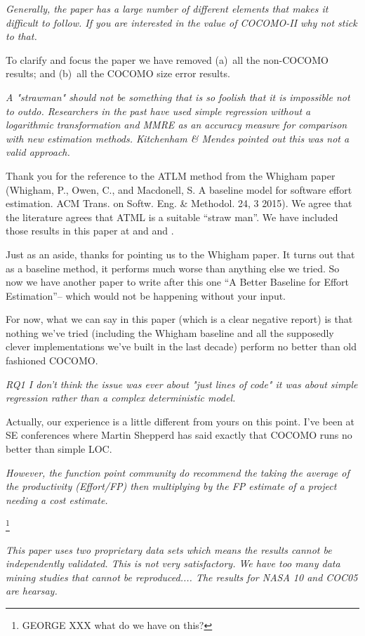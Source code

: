 \documentclass[smallcondesed]{svjour3}
\begin{document}
{\em  Generally, the paper has a large number of different elements  that makes it difficult to follow. If you are interested in the value of COCOMO-II why not stick to that.
}

To clarify and focus the paper we have removed (a)~all the non-COCOMO results;
and (b)~all the COCOMO size error results.

{\em A "strawman" should not be something that is so
  foolish that it is impossible not to
  outdo. Researchers in the past have used simple
  regression without a logarithmic transformation
  and MMRE as an accuracy measure for comparison
  with new estimation methods.  Kitchenham \& Mendes
  pointed out this was not a valid approach.}

Thank you for the reference to the ATLM method from
the Whigham paper (Whigham, P., Owen, C., and
Macdonell, S. A baseline model for software effort
estimation. ACM Trans. on Softw. Eng. \&
Methodol. 24, 3 2015). We agree that the literature
agrees that ATML is a suitable ``straw man''. We
have included those results in this paper at
 and  and  .

Just as an aside, thanks for pointing us to
the  Whigham paper. It turns out that  as a baseline method,
it performs much worse than anything else we tried. So now we have another paper
to write after this one ``A Better Baseline for Effort Estimation''-- which would
not be happening without your input.

For now, what we can say in this paper (which is a clear negative report) is
that nothing we've tried (including the Whigham baseline and
all the supposedly clever implementations
we've built in the last decade) perform no better than old fashioned COCOMO.

{\em RQ1 I don't think the issue was ever about "just lines of code" it was about simple regression rather than a complex  deterministic model. }

Actually, our experience is a little different from yours on this point.
I've been at SE conferences where Martin Shepperd  has said exactly that COCOMO
runs no better than simple LOC.

{\em However,  the function point community do recommend the taking the average of the productivity (Effort/FP) then multiplying by the FP estimate of a project needing a cost estimate.}

\footnote{GEORGE XXX what do we have on this?}

{\em 
  This paper uses two proprietary data sets which means the results cannot be independently validated. This is not very satisfactory. We have too many data mining studies that cannot be reproduced....
The results for NASA 10 and COC05 are hearsay.}
\end{document}
